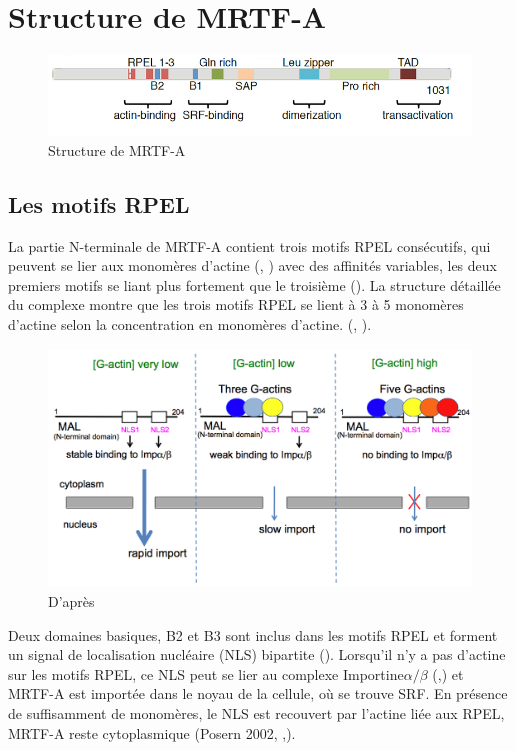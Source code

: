 \documentclass{report}
\begin{document}
\section{Structure de MRTF-A}

\begin{figure}[h!]
\center
\includegraphics[scale=0.5]{MRTFA_structure.png}
\caption{Structure de MRTF-A \parencite{scharenberg_tgf-_2014}}
\end{figure}
 \subsection{Les motifs RPEL}
 
 La partie N-terminale de MRTF-A contient trois motifs RPEL consécutifs, qui peuvent se lier aux monomères d'actine (\cite{posern_mutant_2004}, \cite{mouilleron_molecular_2008}) avec des affinités variables, les deux premiers motifs se liant plus fortement que le troisième (\cite{guettler_rpel_2008}). La structure détaillée du complexe montre que les trois motifs RPEL se lient à 3 à 5 monomères d'actine selon la concentration en monomères d'actine. (\cite{hirano_sensing_2011}, \cite{treisman_structure_2011}). 
 
 
 \begin{figure}[h!]
 \includegraphics[scale=0.30]{MRTF-A_actines_complexes.png}
 \caption{D'après \cite{hirano_sensing_2011}}
 \end{figure}
 Deux domaines basiques, B2 et B3 sont inclus dans les motifs RPEL et forment un signal de localisation nucléaire (NLS) bipartite (\cite{rajakyla_actin-regulated_2010}). Lorsqu'il n'y a pas d'actine sur les motifs RPEL, ce NLS peut se lier au complexe Importine$\alpha / \beta$ (\cite{hirano_sensing_2011},\cite{rajakyla_actin-regulated_2010}) et MRTF-A est importée dans le noyau de la cellule, où se trouve SRF. En présence de suffisamment de monomères, le NLS est recouvert par l'actine liée aux RPEL, MRTF-A reste cytoplasmique (Posern 2002, \cite{miralles_actin_2003},\cite{posern_mutant_2004}). 
 
\end{document}
